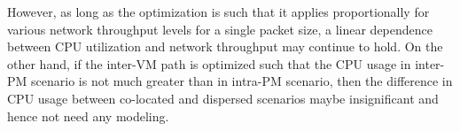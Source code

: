 However, as long as the optimization is such that it applies proportionally 
for various network throughput levels for a single packet size, a linear 
dependence between CPU utilization and network throughput may continue to 
hold. On the other hand, if the inter-VM path is optimized such that the 
CPU usage in inter-PM scenario is not much greater than in intra-PM scenario, 
then the difference in CPU usage between co-located and dispersed scenarios 
maybe insignificant and hence not need any modeling.
